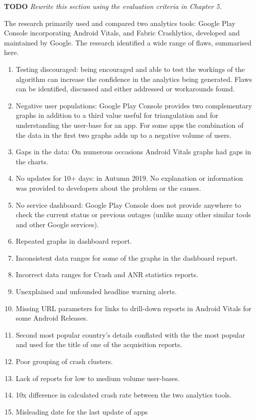 \textbf{TODO} \textit{Rewrite this section using the evaluation criteria in Chapter 5.}

The research primarily used and compared two analytics tools: Google Play Console incorporating Android Vitals, and Fabric Crashlytics, developed and maintained by Google. The research identified a wide range of flaws, summarised here.

\begin{enumerate}
    \item Testing discouraged: being encouraged and able to test the workings of the algorithm can increase the confidence in the analytics being generated. Flaws can be identified, discussed and either addressed or workarounds found.
    \item Negative user populations: Google Play Console provides two complementary graphs in addition to a third value useful for triangulation and for understanding the user-base for an app. For some apps the combination of the data in the first two graphs adds up to a negative volume of users.
    \item Gaps in the data: On numerous occasions Android Vitals graphs had gaps in the charts.
    \item No updates for 10+ days: in Autumn 2019. No explanation or information was provided to developers about the problem or the causes. %
    \item No service dashboard: Google Play Console does not provide anywhere to check the current status or previous outages (unlike many other similar tools and other Google services).
    \item Repeated graphs in dashboard report.
    \item Inconsistent data ranges for some of the graphs in the dashboard report.
    \item Incorrect data ranges for Crash and ANR statistics reports.
    \item Unexplained and unfounded headline warning alerts.
    \item Missing URL parameters for links to drill-down reports in Android Vitals for some Android Releases.
    \item Second most popular country's details conflated with the the most popular and used for the title of one of the acquisition reports.
    \item Poor grouping of crash clusters.
    \item Lack of reports for low to medium volume user-bases.
    \item 10x difference in calculated crash rate between the two analytics tools.
    \item Misleading date for the last update of apps
\end{enumerate}

